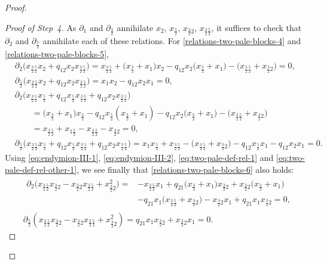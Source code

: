 \documentclass[10pt,a4paper]{amsart}
\numberwithin{equation}{section}
\newcommand{\tresdos}{\frac{3}{2}}
\newcommand{\cincodos}{\frac{5}{2}}
\begin{document}
\begin{proof}
\begin{proof}[Proof of Step~4]
As $\partial_1$ and $\partial_{\tresdos}$ annihilate $x_{2}$, $x_{\cincodos}$, $x_{\tresdos2}$, $x_{\tresdos\cincodos}$,
it suffices to check that $\partial_2$ and $\partial_\cincodos$ annihilate each of these relations. For \eqref{relations-two-pale-blocks-4} and \eqref{relations-two-pale-blocks-5},
\begin{align*}
&\partial_2 \big( x_{\tresdos\cincodos}x_{2} +q_{12} x_{2}x_{\tresdos\cincodos} \big) =
x_{\tresdos\cincodos}+\big(x_\tresdos+x_1\big)x_{2}
 -q_{12} x_{2}\big(x_\tresdos+x_1\big) -\big(x_{\tresdos\cincodos}+x_{\tresdos2}\big)=0,
\\
&\partial_{\cincodos} \big( x_{\tresdos\cincodos}x_{2} +q_{12} x_{2}x_{\tresdos\cincodos} \big) =
x_1x_{2} -q_{12} x_{2}x_1=0,
\\
&\partial_2 \big( x_{\tresdos\cincodos}x_{\cincodos}+q_{12} x_{\cincodos}x_{\tresdos\cincodos} + q_{12}x_{2}x_{\tresdos\cincodos} \big)
\\ &\qquad
{}=\big(x_\tresdos+x_1\big)x_{\cincodos}-q_{12} x_{\cincodos}(x_\tresdos+x_1)
 - q_{12}x_{2}\big(x_\tresdos+x_1\big)-\big(x_{\tresdos\cincodos}+x_{\tresdos2}\big)
 \\ &\qquad
= x_{\tresdos\cincodos}+x_{1\cincodos}-x_{\tresdos\cincodos}-x_{\tresdos2}=0,
\\
 &\partial_{\cincodos} \big( x_{\tresdos\cincodos}x_{\cincodos}\!+q_{12} x_{\cincodos}x_{\tresdos\cincodos} \!+ q_{12}x_{2}x_{\tresdos\cincodos} \big)=
x_1x_{\cincodos}
\!+x_{\tresdos\cincodos}
-\!\big(x_{\tresdos\cincodos}\!+x_{\tresdos2}\big)\!
-q_{12} x_{\cincodos}x_1 -q_{12}x_{2}x_1=0.
\end{align*}
Using \eqref{eq:endymion-III-1}, \eqref{eq:endymion-III-2}, \eqref{eq:two-pale-def-rel-1} and
\eqref{eq:two-pale-def-rel-other-1}, we see finally that \eqref{relations-two-pale-blocks-6} also holds:
\begin{align*}
&\begin{aligned}
\partial_2 \big( x_{\tresdos\cincodos}x_{\tresdos2}-x_{\tresdos2}x_{\tresdos\cincodos} + x_{\tresdos2}^2 \big) ={}&
-x_{\tresdos\cincodos}x_1+q_{21}\big(x_{\tresdos}+x_1\big)x_{\tresdos2}
+x_{\tresdos2}\big(x_{\tresdos}+x_1\big)
\\
& -q_{21}x_1\big(x_{\tresdos\cincodos}+x_{\tresdos2}\big)
- x_{\tresdos2}x_1 +q_{21}x_1x_{\tresdos2}=0,
\end{aligned}
\\
&\partial_{\cincodos} ( x_{\tresdos\cincodos}x_{\tresdos2}-x_{\tresdos2}x_{\tresdos\cincodos} + x_{\tresdos2}^2 ) = q_{21}x_1x_{\tresdos2}+x_{\tresdos2}x_1=0. \tag*{\qed}
\end{align*}
\renewcommand{\qed}{}
\end{proof}


\end{proof}
\end{document}
